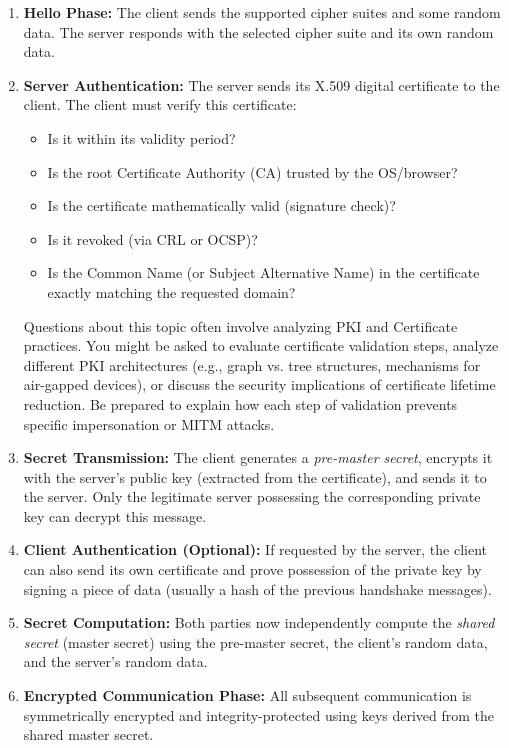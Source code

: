 \begin{enumerate}
    \item \textbf{Hello Phase:} The client sends the supported cipher suites and some random data. The server responds with the selected cipher suite and its own random data.
    \item \textbf{Server Authentication:} The server sends its X.509 digital certificate to the client. The client must verify this certificate:
    \begin{itemize}
        \item Is it within its validity period?
        \item Is the root Certificate Authority (CA) trusted by the OS/browser?
        \item Is the certificate mathematically valid (signature check)?
        \item Is it revoked (via CRL or OCSP)?
        \item Is the Common Name (or Subject Alternative Name) in the certificate exactly matching the requested domain?
    \end{itemize}
    
    \begin{tcolorbox}[colback=blue!5!white,colframe=blue!75!black,title=Exam Insight]
    Questions about this topic often involve analyzing PKI and Certificate practices. You might be asked to evaluate certificate validation steps, analyze different PKI architectures (e.g., graph vs. tree structures, mechanisms for air-gapped devices), or discuss the security implications of certificate lifetime reduction. Be prepared to explain how each step of validation prevents specific impersonation or MITM attacks.
    \end{tcolorbox}

    \item \textbf{Secret Transmission:} The client generates a \textit{pre-master secret}, encrypts it with the server's public key (extracted from the certificate), and sends it to the server. Only the legitimate server possessing the corresponding private key can decrypt this message.
    \item \textbf{Client Authentication (Optional):} If requested by the server, the client can also send its own certificate and prove possession of the private key by signing a piece of data (usually a hash of the previous handshake messages).
    \item \textbf{Secret Computation:} Both parties now independently compute the \textit{shared secret} (master secret) using the pre-master secret, the client's random data, and the server's random data.
    \item \textbf{Encrypted Communication Phase:} All subsequent communication is symmetrically encrypted and integrity-protected using keys derived from the shared master secret.
\end{enumerate}

